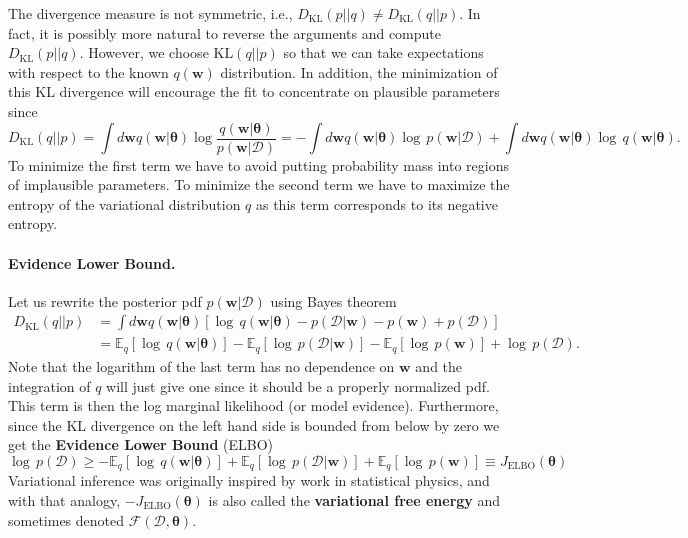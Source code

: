 \documentclass[%
oneside,                 %
final,                   %
10pt]{article}
\begin{document}
\noindent
The divergence measure is not symmetric, i.e., $D_\mathrm{KL}(p||q) \neq D_\mathrm{KL}(q||p)$. In fact, it is possibly more natural to reverse the arguments and compute $D_\mathrm{KL}(p||q)$. However, we choose $\mathrm{KL}(q||p)$ so that we can take expectations with respect to the known $q(\boldsymbol{w})$ distribution. In addition, the minimization of this KL divergence will encourage the fit to concentrate on plausible parameters since
\[
D_\mathrm{KL}(q||p) = \int d \boldsymbol{w} q(\boldsymbol{w}\lvert \boldsymbol{\theta}) \log \frac{q(\boldsymbol{w} \lvert \boldsymbol{\theta})}{p(\boldsymbol{w} \lvert \mathcal{D})} 
= -\int d \boldsymbol{w} q(\boldsymbol{w}\lvert \boldsymbol{\theta}) \log \, p(\boldsymbol{w} \lvert \mathcal{D}) + \int d \boldsymbol{w} q(\boldsymbol{w}\lvert \boldsymbol{\theta}) \log \, q(\boldsymbol{w} \lvert \boldsymbol{\theta}).
\]
To minimize the first term we have to avoid putting probability mass into regions of implausible parameters. To minimize the second term we have to maximize the entropy of the variational distribution $q$ as this term corresponds to its negative entropy.

\paragraph{Evidence Lower Bound.}
Let us rewrite the posterior pdf $p(\boldsymbol{w} \lvert \mathcal{D})$ using Bayes theorem
\begin{align*}
D_\mathrm{KL}(q||p) &= \int d \boldsymbol{w} q(\boldsymbol{w}\lvert \boldsymbol{\theta}) \left[ \log \, q(\boldsymbol{w}\lvert \boldsymbol{\theta})  - p( \mathcal{D} \lvert \boldsymbol{w}) - p(\boldsymbol{w}) + p(\mathcal{D}) \right] \\
&= \mathbb{E}_{q} \left[ \log \, q(\boldsymbol{w} \lvert \boldsymbol{\theta}) \right]
- \mathbb{E}_{q} \left[ \log \, p(\mathcal{D} \lvert \boldsymbol{w}) \right]
- \mathbb{E}_{q} \left[ \log \, p(\boldsymbol{w}) \right]
+ \log \, p(\mathcal{D}).
\end{align*}
Note that the logarithm of the last term has no dependence on $\boldsymbol{w}$ and the integration of $q$ will just give one since it should be a properly normalized pdf. This term is then the log marginal likelihood (or model evidence). Furthermore, since the KL divergence on the left hand side is bounded from below by zero we get the \textbf{Evidence Lower Bound} (ELBO)
\begin{equation}
\log \, p(\mathcal{D}) \ge 
- \mathbb{E}_{q} \left[ \log \, q(\boldsymbol{w} \lvert \boldsymbol{\theta}) \right]
+ \mathbb{E}_{q} \left[ \log \, p(\mathcal{D} \lvert \boldsymbol{w}) \right]
+ \mathbb{E}_{q} \left[ \log \, p(\boldsymbol{w}) \right]
\equiv J_\mathrm{ELBO}(\boldsymbol{\theta})
\label{eq:elbo}
\end{equation}
Variational inference was originally inspired by work in statistical physics, and with that analogy, $-J_\mathrm{ELBO}(\boldsymbol{\theta})$ is also called the \textbf{variational free energy} and sometimes denoted $\mathcal{F}(\mathcal{D},\boldsymbol{\theta})$.
\end{document}
